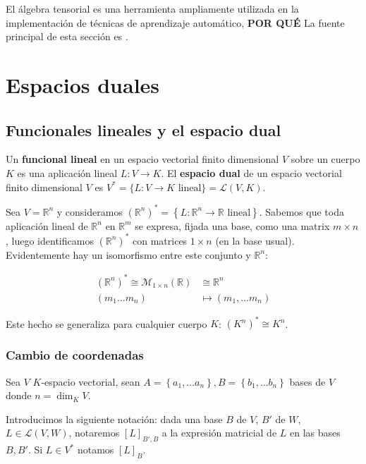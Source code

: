 El álgebra tensorial es una herramienta ampliamente utilizada en la
implementación de técnicas de aprendizaje automático, \textbf{POR QUÉ}
La fuente principal de esta sección es \textcite[capítulo 8]{treil2013}.

\section{Espacios duales}\label{espacios-duales}

\subsection{Funcionales lineales y el espacio
dual}\label{funcionales-lineales-y-el-espacio-dual}

Un \textbf{funcional lineal} en un espacio vectorial finito dimensional
\(V\) sobre un cuerpo \(K\) es una aplicación lineal
\(L:V\rightarrow K\). 
{}
El \textbf{espacio dual} de un espacio vectorial finito dimensional
\(V\) es \(V^*=\{L:V\rightarrow K\text{ lineal}\}=\mathcal{L}(V, K)\).

\exampleb
Sea \(V=\mathbb R^n\) y consideramos
\((\mathbb R^n)^*=\left\{L:\mathbb R^n\rightarrow\mathbb R\text{ lineal}\right\}\).
Sabemos que toda aplicación lineal de \(\mathbb{R}^{n}\) en
\(\mathbb{R}^{m}\) se expresa, fijada una base, como una matrix
\(m\times n\), luego identificamos \((\mathbb{R}^{n})^{*}\) con matrices
\(1\times n\) (en la base usual). Evidentemente hay un isomorfismo entre
este conjunto y \(\mathbb{R}^{n}\):

\begin{align*}
  (\mathbb{R}^{n})^{*} \cong \mathcal{M}_{1\times n}(\mathbb{R})&\cong \mathbb{R}^{n} \\
  (m_{1} \dots m_{n}) &\mapsto (m_{1}, \dots m_{n})
\end{align*}

Este hecho se generaliza para cualquier cuerpo \(K\):
\((K^{n})^{*}\cong K^{n}\). \examplee

\subsubsection{Cambio de coordenadas}\label{cambio-de-coordenadas}

Sea \(V\) \(K\)-espacio vectorial, sean
\(A=\left\{a_{1}, \dots a_{n}\right\}, B=\left\{b_{1}, \dots b_{n}\right\}\)
bases de \(V\) donde \(n = \dim_{K}V\).

Introducimos la siguiente notación: dada una base \(B\) de \(V\), \(B'\)
de \(W\), \(L\in\mathcal L(V, W)\), notaremos \([L]_{B', B}\) a la
expresión matricial de \(L\) en las bases \(B, B'\). Si \(L\in V^{*}\)
notamos \([L]_{B}\).


